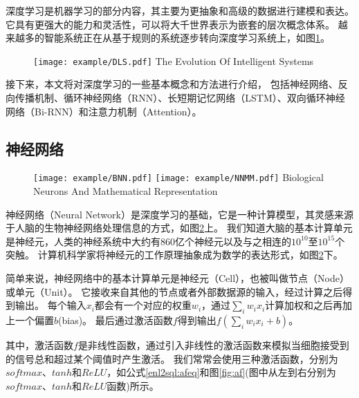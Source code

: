 深度学习是机器学习的部分内容，其主要为更抽象和高级的数据进行建模和表达。
它具有更强大的能力和灵活性，可以将大千世界表示为嵌套的层次概念体系。
越来越多的智能系统正在从基于规则的系统逐步转向深度学习系统上，如图\ref{fig:DLS}。

\begin{figure}[!htp]
  \centering
  \texttt{[image: example/DLS.pdf]}
    {The Evolution Of Intelligent Systems}
  \label{fig:DLS}
\end{figure}

接下来，本文将对深度学习的一些基本概念和方法进行介绍，
包括神经网络、反向传播机制、循环神经网络（RNN）、长短期记忆网络（LSTM）、双向循环神经网络（Bi-RNN）和注意力机制（Attention）。

\subsection{神经网络}

\begin{figure}[!htp]
  \centering
  \texttt{[image: example/BNN.pdf]}
  \texttt{[image: example/NNMM.pdf]}
    {Biological Neurons And Mathematical Representation}
  \label{fig:BNNandNNMM}
\end{figure}

神经网络（Neural Network）是深度学习的基础，它是一种计算模型，其灵感来源于人脑的生物神经网络处理信息的方式，如图\ref{fig:BNNandNNMM}上。
我们知道大脑的基本计算单元是神经元，人类的神经系统中大约有860亿个神经元以及与之相连的$10^{10}$至$10^{15}$个突触。
计算机科学家将神经元的工作原理抽象成为数学的表达形式，如图\ref{fig:BNNandNNMM}下。


简单来说，神经网络中的基本计算单元是神经元（Cell），也被叫做节点（Node）或单元（Unit）。
它接收来自其他的节点或者外部数据源的输入，经过计算之后得到输出。
每个输入$x_i$都会有一个对应的权重$w_i$，通过$\sum_i w_ix_i$计算加权和之后再加上一个偏置$b$(bias)。
最后通过激活函数$f$得到输出$f(\sum_i w_ix_i +b)$。

其中，激活函数$f$是非线性函数，通过引入非线性的激活函数来模拟当细胞接受到的信号总和超过某个阈值时产生激活。
我们常常会使用三种激活函数，分别为$softmax$、$tanh$和$ReLU$，如公式\ref{enl2sql:afeq}和图\ref{fig:af}(图中从左到右分别为$softmax$、$tanh$和$ReLU$函数)所示。


